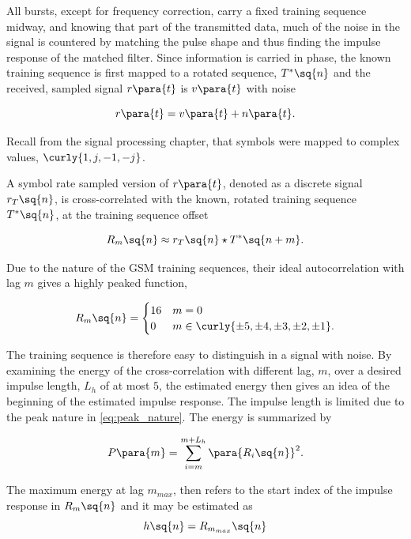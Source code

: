 All bursts, except for frequency correction, carry a fixed training
sequence midway, and knowing that part of the transmitted data, much
of the noise in the signal is countered by matching the pulse shape
and thus finding the impulse response of the matched filter. Since
information is carried in phase, the known training sequence is first
mapped to a rotated sequence, $T^* \sq{n}$ and the received, sampled signal
$r \para{t}$ is $v \para{t}$ with noise

\begin{equation}
  r \para{t} = v \para{t} + n \para{t}.
\end{equation}

Recall from the signal processing chapter, that symbols were mapped to
complex values, $\curly{1, j, -1, -j}$.

A symbol rate sampled version of $r \para{t}$, denoted as a discrete
signal $r_T \sq{n}$, is cross-correlated with the known, rotated
training sequence $T^{\ast} \sq{n}$, at the training sequence offset

\begin{equation}
  R_m\sq{n} \approx r_T\sq{n} \star T^* \sq{n + m}.
\end{equation}

Due to the nature of the \gls{GSM} training sequences, their ideal
autocorrelation with lag $m$ gives a highly peaked function,

\begin{equation}
  R_m \sq{n} = \begin{cases}
    16 & m = 0\\
    0 & m \in \curly{\pm5, \pm4, \pm3, \pm2, \pm1}.
  \end{cases}
  \label{eq:peak_nature}
\end{equation}

The training sequence is therefore easy to distinguish in a signal
with noise. By examining the energy of the cross-correlation with
different lag, $m$, over a desired impulse length, $L_h$ of at most
$5$, the estimated energy then gives an idea of the beginning of the
estimated impulse response. The impulse length is limited due to the
peak nature in \cref{eq:peak_nature}. The energy is summarized by

\begin{equation}
  P \para{m} = \sum\limits^{m+L_h}_{i = m} \para{R_i \sq{n}}^2.
\end{equation}

The maximum energy at lag $m_{max}$, then refers to the start index of
the impulse response in $R_{m}\sq{n}$ and it may be estimated as
\begin{equation}
  h \sq{n} = R_{m_{max}} \sq{n}
\end{equation}

